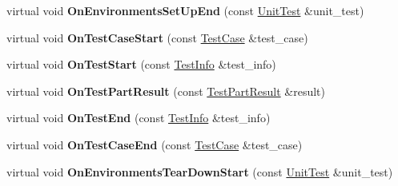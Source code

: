 \begin{DoxyCompactItemize}
\item 
\hypertarget{classtesting_1_1internal_1_1TestEventRepeater_a3a92696df942dc92f985e52fddd6d303}{virtual void {\bfseries On\-Environments\-Set\-Up\-End} (const \hyperlink{classtesting_1_1UnitTest}{Unit\-Test} \&unit\-\_\-test)}\label{classtesting_1_1internal_1_1TestEventRepeater_a3a92696df942dc92f985e52fddd6d303}

\item 
\hypertarget{classtesting_1_1internal_1_1TestEventRepeater_a70124c738caa338bcd723eb2a51c8b3e}{virtual void {\bfseries On\-Test\-Case\-Start} (const \hyperlink{classtesting_1_1TestCase}{Test\-Case} \&test\-\_\-case)}\label{classtesting_1_1internal_1_1TestEventRepeater_a70124c738caa338bcd723eb2a51c8b3e}

\item 
\hypertarget{classtesting_1_1internal_1_1TestEventRepeater_a70d694ca5010cc86cd458f7f529e6fbe}{virtual void {\bfseries On\-Test\-Start} (const \hyperlink{classtesting_1_1TestInfo}{Test\-Info} \&test\-\_\-info)}\label{classtesting_1_1internal_1_1TestEventRepeater_a70d694ca5010cc86cd458f7f529e6fbe}

\item 
\hypertarget{classtesting_1_1internal_1_1TestEventRepeater_ac8fb21da6802b1ebab9cad3eee9150eb}{virtual void {\bfseries On\-Test\-Part\-Result} (const \hyperlink{classtesting_1_1TestPartResult}{Test\-Part\-Result} \&result)}\label{classtesting_1_1internal_1_1TestEventRepeater_ac8fb21da6802b1ebab9cad3eee9150eb}

\item 
\hypertarget{classtesting_1_1internal_1_1TestEventRepeater_aa0f13bded9369aae1c78583d7276f8b1}{virtual void {\bfseries On\-Test\-End} (const \hyperlink{classtesting_1_1TestInfo}{Test\-Info} \&test\-\_\-info)}\label{classtesting_1_1internal_1_1TestEventRepeater_aa0f13bded9369aae1c78583d7276f8b1}

\item 
\hypertarget{classtesting_1_1internal_1_1TestEventRepeater_a0a335e1c3957a8c699ed56e37ea7b978}{virtual void {\bfseries On\-Test\-Case\-End} (const \hyperlink{classtesting_1_1TestCase}{Test\-Case} \&test\-\_\-case)}\label{classtesting_1_1internal_1_1TestEventRepeater_a0a335e1c3957a8c699ed56e37ea7b978}

\item 
\hypertarget{classtesting_1_1internal_1_1TestEventRepeater_a30db75df2d9a65d787f31e16004613c2}{virtual void {\bfseries On\-Environments\-Tear\-Down\-Start} (const \hyperlink{classtesting_1_1UnitTest}{Unit\-Test} \&unit\-\_\-test)}\label{classtesting_1_1internal_1_1TestEventRepeater_a30db75df2d9a65d787f31e16004613c2}


\end{DoxyCompactItemize}
